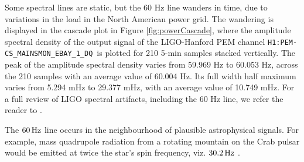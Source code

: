 \documentclass[pra,superscriptaddress,reprint,amsmath,amssymb,nofootinbib]{revtex4-2}
\newcommand{\CSOneName}{\texttt{H1:PEM-CS\_MAINSMON\_EBAY\_1\_DQ}}
\begin{document}
Some spectral lines are static, but the 60 Hz line wanders in time, due to variations in the load in the North American power grid. The wandering is displayed in the cascade plot in Figure \ref{fig:powerCascade}, where the amplitude spectral density of the output signal of the LIGO-Hanford PEM channel \CSOneName \, is plotted for 210 5-min samples stacked vertically. The peak of the amplitude spectral density varies from 59.969 Hz  to 60.053 Hz, across the 210 samples with an average value of 60.004 Hz. Its full width half maximum varies from 5.294 mHz to 29.377 mHz, with an average value of 10.749  mHz. For a full review of LIGO spectral artifacts, including the 60 Hz line, we refer the reader to \cite{CovasEtAl:2018}. \newline 


The $60 \, {\rm Hz}$ line occurs in the neighbourhood of plausible astrophysical signals. For example, mass quadrupole radiation from a rotating mountain on the Crab pulsar would be emitted at twice the star's spin frequency, viz. $30.2 \, {\rm Hz}$ \citep{Riles2023,Wette2023}.
\end{document}
